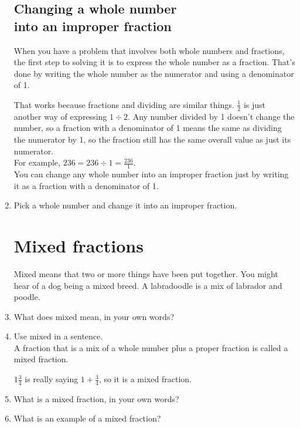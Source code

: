 \documentclass[14pt]{article}
\begin{document}
\begin{enumerate}
\newpage

\subsection*{Changing a whole number \\ into an improper fraction}
When you have a problem that involves both whole numbers and fractions, the first step to solving it is to express the whole number as a fraction. That’s done by writing the whole number as the numerator and using a denominator of 1.

That works because fractions and dividing are similar things. $\frac{1}{2}$ is just another way of expressing $1 \div 2$. Any number divided by 1 doesn't change the number, so a fraction with a denominator of 1 means the same as dividing the numerator by 1, so the fraction still has the same overall value as just its numerator.\\

For example, $236 = 236 \div 1 = \frac{236}{1}$.\\

You can change any whole number into an improper fraction just by writing it as a fraction with a denominator of 1.\\

\item Pick a whole number and change it into an improper fraction.

\newpage

\section{Mixed fractions}

Mixed means that two or more things have been put together. You might hear of a dog being a mixed breed. A labradoodle is a mix of labrador and poodle.

\item What does mixed mean, in your own words?
\item Use mixed in a sentence.\\

A fraction that is a mix of a whole number plus a proper fraction is called a mixed fraction.

$1\frac{3}{4}$ is really saying $1 + \frac{3}{4}$, so it is a mixed fraction.\\

\item What is a mixed fraction, in your own words?
\item What is an example of a mixed fraction?\\


\end{enumerate}
\end{document}
